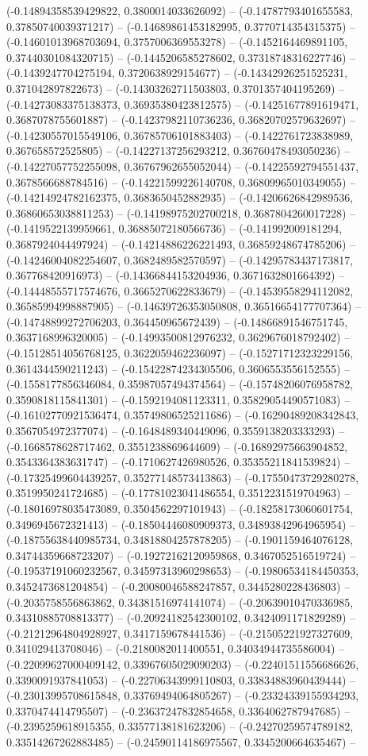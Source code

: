 (-0.14894358539429822, 0.3800014033626092) -- (-0.14787793401655583, 0.37850740039371217) -- (-0.14689861453182995, 0.3770714354315375) -- (-0.14601013968703694, 0.3757006369553278) -- (-0.1452164469891105, 0.37440301084320715) -- (-0.1445206585278602, 0.37318748316227746) -- (-0.1439247704275194, 0.3720638929154677) -- (-0.14342926251525231, 0.371042897822673) -- (-0.14303262711503803, 0.3701357404195269) -- (-0.14273083375138373, 0.36935380423812575) -- (-0.14251677891619471, 0.3687078755601887) -- (-0.14237982110736236, 0.36820702579632697) -- (-0.14230557015549106, 0.36785706101883403) -- (-0.1422761723838989, 0.367658572525805) -- (-0.14227137256293212, 0.36760478493050236) -- (-0.14227057752255098, 0.36767962655052044) -- (-0.14225592794551437, 0.3678566688784516) -- (-0.14221599226140708, 0.36809965010349055) -- (-0.14214924782162375, 0.3683650452882935) -- (-0.14206626842989536, 0.36860653038811253) -- (-0.14198975202700218, 0.3687804260017228) -- (-0.1419522139959661, 0.36885072180566736) -- (-0.141992009181294, 0.3687924044497924) -- (-0.14214886226221493, 0.36859248674785206) -- (-0.14246004082254607, 0.3682489582570597) -- (-0.14295783437173817, 0.367768420916973) -- (-0.14366844153204936, 0.3671632801664392) -- (-0.14448555717574676, 0.3665270622833679) -- (-0.14539558294112082, 0.36585994998887905) -- (-0.14639726353050808, 0.36516654177707364) -- (-0.14748899272706203, 0.364450965672439) -- (-0.14866891546751745, 0.3637168996320005) -- (-0.14993500812976232, 0.3629676018792402) -- (-0.15128514056768125, 0.3622059462236097) -- (-0.15271712323229156, 0.3614344590211243) -- (-0.15422874234305506, 0.3606553556152555) -- (-0.1558177856346084, 0.35987057494374564) -- (-0.15748206076958782, 0.3590818115841301) -- (-0.1592194081123311, 0.35829054490571083) -- (-0.16102770921536474, 0.35749806525211686) -- (-0.16290489208342843, 0.3567054972377074) -- (-0.1648489340449096, 0.3559138203333293) -- (-0.1668578628717462, 0.3551238869644609) -- (-0.16892975663904852, 0.3543364383631747) -- (-0.1710627426980526, 0.35355211841539824) -- (-0.17325499604439257, 0.35277148573413863) -- (-0.17550473729280278, 0.3519950241724685) -- (-0.17781023041486554, 0.3512231519704963) -- (-0.18016978035473089, 0.3504562297101943) -- (-0.18258173060601754, 0.3496945672321413) -- (-0.18504446080909373, 0.34893842964965954) -- (-0.18755638440985734, 0.34818804257878205) -- (-0.1901159464076128, 0.34744359668723207) -- (-0.19272162120959868, 0.3467052516519724) -- (-0.19537191060232567, 0.34597313960298653) -- (-0.19806534184450353, 0.3452473681204854) -- (-0.20080046588247857, 0.3445280228436803) -- (-0.2035758556863862, 0.34381516974141074) -- (-0.20639010470336985, 0.34310885708813377) -- (-0.20924182542300102, 0.3424091171829289) -- (-0.21212964804928927, 0.3417159678441536) -- (-0.21505221927327609, 0.341029413708046) -- (-0.2180082011400551, 0.34034944735586004) -- (-0.22099627000409142, 0.33967605029090203) -- (-0.22401511556686626, 0.3390091937841053) -- (-0.22706343999110803, 0.33834883960439444) -- (-0.23013995708615848, 0.33769494064805267) -- (-0.23324339155934293, 0.3370474414795507) -- (-0.23637247832854658, 0.3364062787947685) -- (-0.2395259618915355, 0.33577138181623206) -- (-0.24270259574789182, 0.33514267262883485) -- (-0.24590114186975567, 0.3345200664635467) -- 